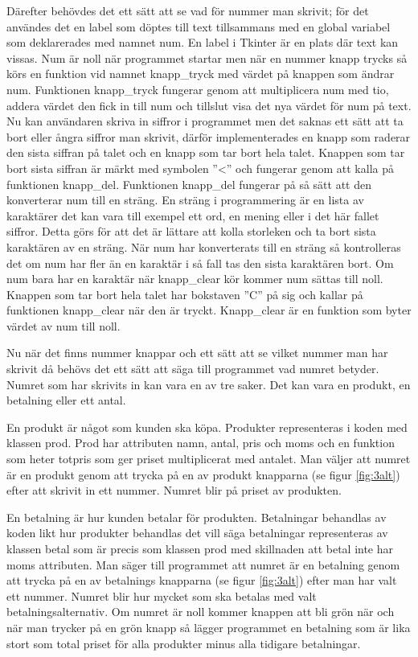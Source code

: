 \documentclass[a4paper, 12pt]{article}
\begin{document}
Därefter behövdes det ett sätt att se vad för nummer man skrivit; för det användes det en label som döptes till text tillsammans med en global variabel som deklarerades med namnet num.
En label i Tkinter är en plats där text kan vissas.
Num är noll när programmet startar men när en nummer knapp trycks så körs en funktion vid namnet knapp\_tryck med värdet på knappen som ändrar num. Funktionen knapp\_tryck fungerar genom att multiplicera num med tio, addera värdet den fick in till num och tillslut visa det nya värdet för num på text. 
Nu kan användaren skriva in siffror i programmet men det saknas ett sätt att ta bort eller ångra siffror man skrivit, därför implementerades en knapp som raderar den sista siffran på talet och en knapp som tar bort hela talet.
Knappen som tar bort sista siffran är märkt med symbolen ''\textless'' och fungerar genom att kalla på funktionen knapp\_del. Funktionen knapp\_del fungerar på så sätt att den konverterar num till en sträng.
En sträng i programmering är en lista av karaktärer det kan vara till exempel ett ord, en mening eller i det här fallet siffror.
Detta görs för att det är lättare att kolla storleken och ta bort sista karaktären av en sträng. 
När num har konverterats till en sträng så kontrolleras det om num har fler än en karaktär i så fall tas den sista karaktären bort. Om num bara har en karaktär när knapp\_clear kör kommer num sättas till noll.
Knappen som tar bort hela talet har bokstaven ''C'' på sig och kallar på funktionen knapp\_clear när den är tryckt. Knapp\_clear är en funktion som byter värdet av num till noll.


Nu när det finns nummer knappar och ett sätt att se vilket nummer man har skrivit då behövs det ett sätt att säga till programmet vad numret betyder. Numret som har skrivits in kan vara en av tre saker. 
Det kan vara en produkt, en betalning eller ett antal.

En produkt är något som kunden ska köpa. Produkter representeras i koden med klassen prod. Prod har attributen namn, antal, pris och moms och en funktion som heter totpris som ger priset multiplicerat med antalet. 
Man väljer att numret är en produkt genom att trycka på en av produkt knapparna (se figur \ref{fig:3alt}) efter att skrivit in ett nummer. Numret blir på priset av produkten.


En betalning är hur kunden betalar för produkten. Betalningar behandlas av koden likt hur produkter behandlas det vill säga
betalningar representeras av klassen betal som är precis som klassen prod med skillnaden att betal inte har moms attributen. Man säger till programmet att numret är en betalning genom att trycka på en av betalnings knapparna (se figur \ref{fig:3alt}) efter man har valt ett nummer. Numret blir hur mycket som ska betalas med valt betalningsalternativ. Om numret är noll kommer knappen att bli grön när och när man trycker på en grön knapp så lägger programmet en betalning som är lika stort som total priset för alla produkter minus alla tidigare betalningar.
\end{document}
